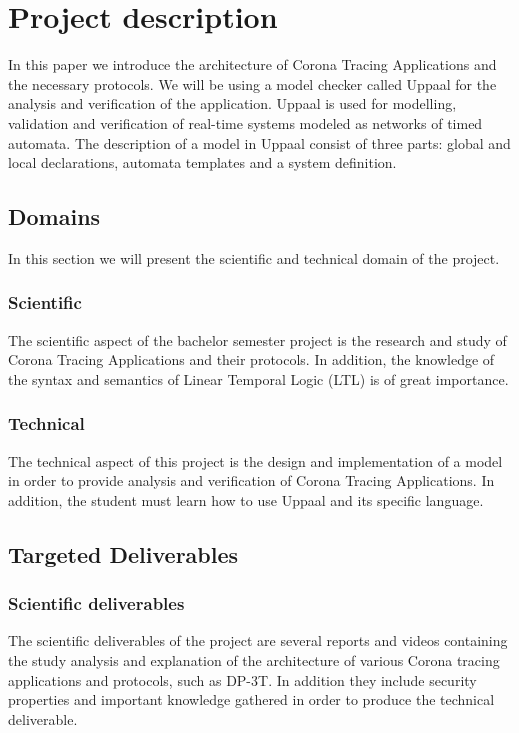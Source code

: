 \documentclass[a4paper, twocolumn]{article}
\begin{document}
\section{Project description}
In this paper we introduce the architecture of Corona Tracing Applications and the necessary protocols. We will be using a model checker called Uppaal \cite{uppaal} for the analysis and verification of the application. Uppaal is used for modelling, validation and verification of real-time systems modeled as networks of timed automata. The description of a model in Uppaal consist of three parts: global and local declarations, automata templates and a system definition.


\subsection{Domains}
In this section we will present the scientific and technical domain of the project.
\subsubsection{Scientific }
The scientific aspect of the bachelor semester project is the research and study of Corona Tracing Applications and their protocols.
In addition, the knowledge of the syntax and semantics of Linear Temporal Logic (LTL) is of great importance.
\subsubsection{Technical}
The technical aspect of this project is the design and implementation of a model in order to provide analysis and verification of Corona Tracing Applications. In addition, the student must learn how to use Uppaal and its specific language.

\subsection{Targeted Deliverables}
\label{sec-deliverables}
\subsubsection{Scientific deliverables}
The scientific deliverables of the project are several reports and videos containing the study analysis and explanation of the architecture of various Corona tracing applications and protocols, such as DP-3T. In addition they include security properties and important knowledge gathered in order to produce the technical deliverable.
\end{document}

